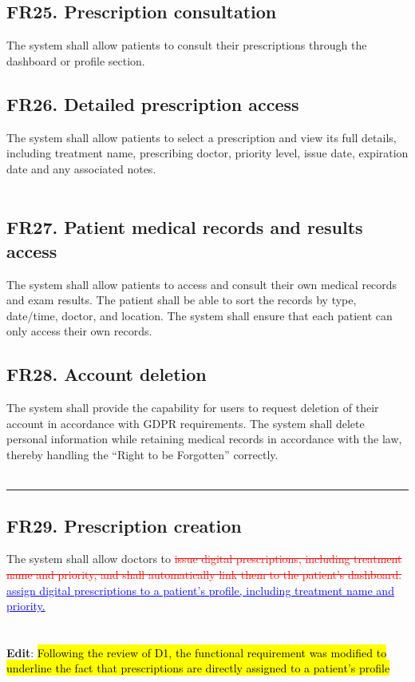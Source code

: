\documentclass[12pt, a4paper]{article}
\begin{document}
\subsection{FR25. Prescription consultation} \label{FR25}
The system shall allow patients to consult their prescriptions through the dashboard or profile section.
\\ 

\subsection{FR26. Detailed prescription access} \label{FR26}
The system shall allow patients to select a prescription and view its full details, including treatment name, prescribing doctor, priority level, issue date, expiration date and any associated notes.
\\ 
\\ 

\subsection{FR27. Patient medical records and results access} \label{FR27}
The system shall allow patients to access and consult their own medical records and exam results. The patient shall be able to sort the records by type, date/time, doctor, and location. The system shall ensure that each patient can only access their own records.
\\ 

\subsection{FR28. Account deletion} \label{FR28}
The system shall provide the capability for users to request deletion of their account in accordance with GDPR requirements. The system shall delete personal information while retaining medical records in accordance with the law, thereby handling the ``Right to be Forgotten'' correctly.
\\ 
\\ 

\noindent\rule{\textwidth}{0.4pt}
\medskip
\subsection{FR29. Prescription creation} \label{FR29}
The system shall allow doctors to \textcolor{red}{\sout{issue digital prescriptions, including treatment name and priority, and shall automatically link them to the patient’s dashboard.}} \textcolor{blue}{\uline{assign digital prescriptions to a patient's profile, including treatment name and priority.}}
\\ 
\\
\\ \textbf{Edit}:
\hl{Following the review of D1, the functional requirement was modified to underline the fact that prescriptions are directly assigned to a patient's profile}
\end{document}
